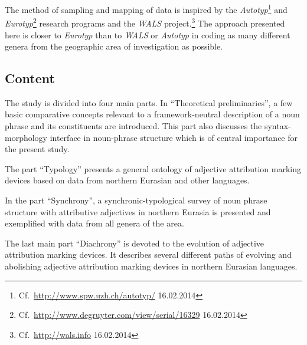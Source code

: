 The method of sampling and mapping of data is inspired by the \emph{Autotyp}\footnote{Cf.~\url{http://www.spw.uzh.ch/autotyp/} 16.02.2014} and \emph{Eurotyp}\footnote{Cf.~\url{http://www.degruyter.com/view/serial/16329} 16.02.2014} research programs and the \emph{WALS} project.\footnote{Cf.~\url{http://wals.info} 16.02.2014} The approach presented here is closer to \emph{Eurotyp} than to \emph{WALS} or \emph{Autotyp} in coding as many different genera from the geographic area of investigation as possible.

\subsection*{Content}
The study is divided into four main parts. In “Theoretical preliminaries”, a few basic comparative concepts relevant to a framework-neutral description of a noun phrase and its constituents are introduced. This part also discusses the syntax-morphology interface in noun-phrase structure which is of central importance for the present study.

The part “Typology” presents a general ontology of adjective attribution marking devices based on data from northern Eurasian and other languages.

In the part “Synchrony”, a synchronic-typological survey of noun phrase structure with attributive adjectives in northern Eurasia is presented and exemplified with data from all genera of the area.

The last main part “Diachrony” is devoted to the evolution of adjective attribution marking devices. It describes several different paths of evolving and abolishing adjective attribution marking devices in northern Eurasian languages.
